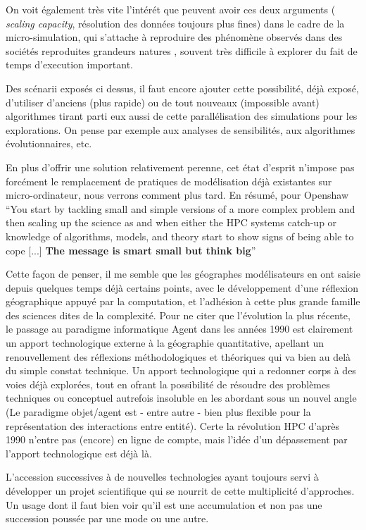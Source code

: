 On voit également très vite l'intérét que peuvent avoir ces deux arguments ( \textit{scaling capacity}, résolution des données toujours plus fines) dans le cadre de la micro-simulation, qui s'attache à reproduire des phénomène observés dans des sociétés reproduites grandeurs natures \autocite{Sanders2006}, souvent très difficile à explorer du fait de temps d'execution important.

Des scénarii exposés ci dessus, il faut encore ajouter cette possibilité, déjà exposé, d'utiliser d'anciens (plus rapide) ou de tout nouveaux (impossible avant) algorithmes tirant parti eux aussi de cette parallélisation des simulations pour les explorations. On pense par exemple aux analyses de sensibilités, aux algorithmes évolutionnaires, etc.

En plus d'offrir une solution relativement perenne, cet état d'esprit n'impose pas forcément le remplacement de pratiques de modélisation déjà existantes sur micro-ordinateur, nous verrons comment plus tard. En résumé, pour Openshaw \foreignquote{english}{You start by tackling small and simple versions of a more complex problem and then scaling up the science as and when either the HPC systems catch-up or knowledge of algorithms, models, and theory start to show signs of being able to cope [...] \textbf{The message is smart small but think big}}

Cette façon de penser, il me semble que les géographes modélisateurs en ont saisie depuis quelques temps déjà certains points, avec le développement d'une réflexion géographique appuyé par la computation, et l'adhésion à cette plus grande famille des sciences dites de la complexité. Pour ne citer que l'évolution la plus récente, le passage au paradigme informatique Agent dans les années 1990 est clairement un apport technologique externe à la géographie quantitative, apellant un renouvellement des réflexions méthodologiques et théoriques \autocite{Sanders2006} qui va bien au delà du simple constat technique. Un apport technologique qui a redonner corps à des voies déjà explorées, tout en ofrant la possibilité de résoudre des problèmes techniques ou conceptuel autrefois insoluble en les abordant sous un nouvel angle (Le paradigme objet/agent est - entre autre - bien plus flexible pour la représentation des interactions entre entité). Certe la révolution HPC d'après 1990 n'entre pas (encore) en ligne de compte, mais l'idée d'un dépassement par l'apport technologique est déjà là.

L'accession successives à de nouvelles technologies ayant toujours servi à développer un projet scientifique qui se nourrit de cette multiplicité d'approches. Un usage dont il faut bien voir qu'il est une accumulation et non pas une succession poussée par une mode ou une autre.

